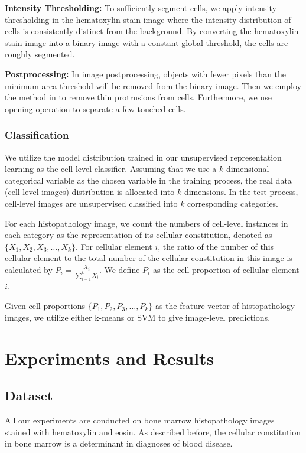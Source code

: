 \documentclass[journal]{IEEEtran}
\begin{document}
\textbf{Intensity Thresholding:} To sufficiently segment cells, we apply intensity thresholding in the hematoxylin stain image where the intensity distribution of cells is consistently distinct from the background. By converting the hematoxylin stain image into a binary image with a constant global threshold, the cells are roughly segmented.

\textbf{Postprocessing:} In image postprocessing, objects with fewer pixels than the minimum area threshold will be removed from the binary image. Then we employ the method in \cite{Wienert2012Detection} to remove thin protrusions from cells. Furthermore, we use opening operation to separate a few touched cells. 

\subsubsection{Classification}
We utilize the model distribution trained in our unsupervised representation learning as the cell-level classifier. Assuming that we use a $k$-dimensional categorical variable as the chosen variable in the training process, the real data (cell-level images) distribution is allocated into $k$ dimensions. In the test process, cell-level images are unsupervised classified into $k$ corresponding categories. 

For each histopathology image, we count the numbers of cell-level instances in each category as the representation of its cellular constitution, denoted as $\{X_1, X_2, X_3, \ldots, X_k\}$. For cellular element $i$, the ratio of the number of this cellular element to the total number of the cellular constitution in this image is calculated by $P_i=\frac{X_i}{\sum_{i=1}^{k}{X_i}}$. We define $P_i$ as the cell proportion of cellular element $i$. 

Given cell proportions $\{P_1, P_2, P_3, \ldots, P_k\}$ as the feature vector of histopathology images, we utilize either k-means or SVM to give image-level predictions. 

\section{Experiments and Results}

\subsection{Dataset} \label{subsection:dataset}
All our experiments are conducted on bone marrow histopathology images stained with hematoxylin and eosin. As described before, the cellular constitution in bone marrow is a determinant in diagnoses of blood disease.
\end{document}
